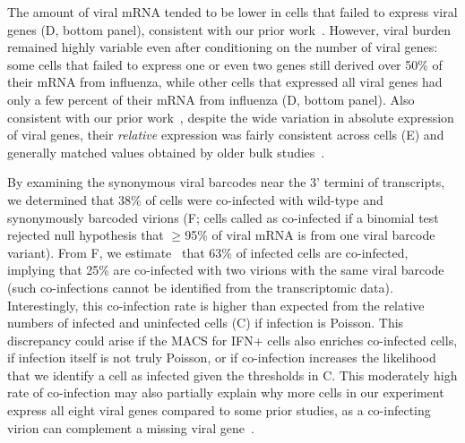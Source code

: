 \documentclass[9pt,lineno]{elife}
\begin{document}
The amount of viral mRNA tended to be lower in cells that failed to express viral genes (D, bottom panel), consistent with our prior work~\citep{russell2018extreme}.
However, viral burden remained highly variable even after conditioning on the number of viral genes: some cells that failed to express one or even two genes still derived over 50\% of their mRNA from influenza, while other cells that expressed all viral genes had only a few percent of their mRNA from influenza (D, bottom panel).
Also consistent with our prior work~\citep{russell2018extreme}, despite the wide variation in absolute expression of viral genes, their \emph{relative} expression was fairly consistent across cells (E) and generally matched values obtained by older bulk studies~\citep{hatada1989control}.

By examining the synonymous viral barcodes near the 3' termini of transcripts, we determined that 38\% of cells were co-infected with wild-type and synonymously barcoded virions (F; cells called as co-infected if a binomial test rejected null hypothesis that $\ge$95\% of viral mRNA is from one viral barcode variant).
From F, we estimate~\citep{bloom2018estimating} that 63\% of infected cells are co-infected, implying that 25\% are co-infected with two virions with the same viral barcode (such co-infections cannot be identified from the transcriptomic data).
Interestingly, this co-infection rate is higher than expected from the relative numbers of infected and uninfected cells (C) if infection is Poisson.
This discrepancy could arise if the MACS for IFN+ cells also enriches co-infected cells, if infection itself is not truly Poisson, or if co-infection increases the likelihood that we identify a cell as infected given the thresholds in C.
This moderately high rate of co-infection may also partially explain why more cells in our experiment express all eight viral genes compared to some prior studies, as a co-infecting virion can complement a missing viral gene~\citep{russell2018extreme}. 
\end{document}
